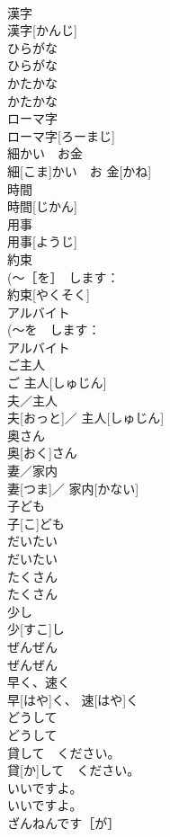 \documentclass[8pt]{extreport}
\begin{document}
\begin{CJK}{UTF8}{min}
\\	漢字	
\\	漢字[かんじ]	
\\	ひらがな	
\\	ひらがな	
\\	かたかな	
\\	かたかな	
\\	ローマ字	
\\	ローマ字[ろーまじ]	
\\	細かい　お金	
\\	細[こま]かい　お 金[かね]	
\\	時間	
\\	時間[じかん]	
\\	用事	
\\	用事[ようじ]	
\\	約束	
\\	(～［を］　します：
\\	約束[やくそく]	
\\	アルバイト	
\\	(～を　します：
\\	アルバイト	
\\	ご主人	
\\	ご 主人[しゅじん]	
\\	夫／主人	
\\	夫[おっと]／ 主人[しゅじん]	
\\	奥さん	
\\	奥[おく]さん	
\\	妻／家内	
\\	妻[つま]／ 家内[かない]	
\\	子ども	
\\	子[こ]ども	
\\	だいたい	
\\	だいたい	
\\	たくさん	
\\	たくさん	
\\	少し	
\\	少[すこ]し	
\\	ぜんぜん	
\\	ぜんぜん	
\\	早く、速く	
\\	早[はや]く、 速[はや]く	
\\	どうして	
\\	どうして	
\\	貸して　ください。	
\\	貸[か]して　ください。	
\\	いいですよ。	
\\	いいですよ。	
\\	ざんねんです［が］	

\end{CJK}
\end{document}
